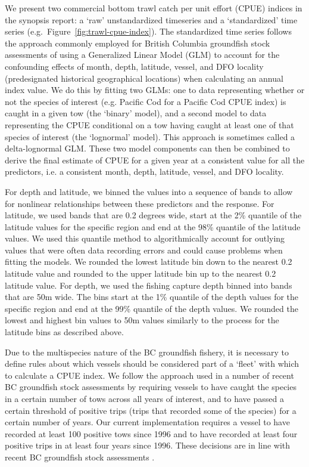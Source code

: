 \documentclass[11pt]{book}\usepackage[]{graphicx}\usepackage[]{color}
\begin{document}
We present two commercial bottom trawl catch per unit effort (CPUE) indices in
the synopsis report: a `raw' unstandardized timeseries and a `standardized' time
series (e.g.\ Figure~\ref{fig:trawl-cpue-index}). The standardized time series
follows the approach commonly employed for British Columbia groundfish stock
assessments of using a Generalized Linear Model (GLM) to account for the
confounding effects of month, depth, latitude, vessel, and DFO locality
(predesignated historical geographical locations) when calculating an annual
index value. We do this by fitting two GLMs: one to data representing whether or
not the species of interest (e.g. Pacific Cod for a Pacific Cod CPUE index) is
caught in a given tow (the `binary' model),
and a second model to data representing the CPUE conditional on a tow having caught
at least one of that species of interest (the `lognormal' model). This approach is
sometimes called a delta-lognormal GLM. These two model components can then be
combined to derive the final estimate of CPUE for a given year at a consistent
value for all the predictors, i.e. a consistent month, depth, latitude, vessel,
and DFO locality.

For depth and latitude, we binned the values into a sequence of bands to allow
for nonlinear relationships between these predictors and the response. For
latitude, we used bands that are 0.2 degrees wide, start at the 2\% quantile of
the latitude values for the specific region and end at the 98\% quantile of the
latitude values. We used this quantile method to algorithmically account for
outlying values that were often data recording errors and could cause problems
when fitting the models. We rounded the lowest latitude bin down to the nearest
0.2 latitude value and rounded to the upper latitude bin up to the nearest 0.2
  latitude value. For depth, we used the fishing capture depth binned into bands
  that are 50m wide. The bins start at the 1\% quantile of the depth values for
  the specific region and end at the 99\% quantile of the depth values. We
  rounded the lowest and highest bin values to 50m values similarly to the
  process for the latitude bins as described above.

Due to the multispecies nature of the BC groundfish fishery, it is necessary to
define rules about which vessels should be considered part of a `fleet'
with which to calculate a CPUE index. We follow the approach used in a number of
recent BC groundfish stock assessments by requiring vessels to have caught the
species in a certain number of tows across all years of interest, and to have
passed a certain threshold of positive trips (trips that recorded some of the
species) for a certain number of years. Our current implementation requires a
vessel to have recorded at least 100 positive tows since 1996 and to have
recorded at least four positive trips in at least four years since 1996. These
decisions are in line with recent BC groundfish stock assessments
\citep[e.g.][]{starr2017pollock}.
\end{document}
